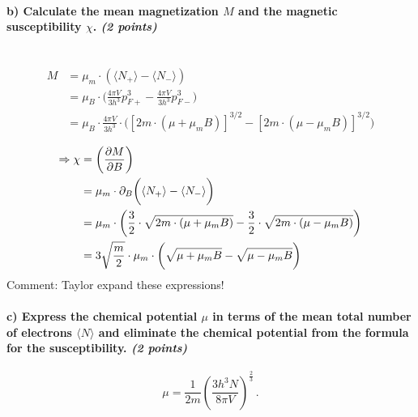 \paragraph{b) Calculate the mean magnetization $M$ and the magnetic 
    susceptibility $\chi$. \textit{(2 points)}
} \ \\
    \begin{align}
        M
        &=\mu_m\cdot(\langle N_+\rangle-\langle N_-\rangle) \\
        &=\mu_B\cdot\bigg(
            \frac{4\pi V}{3h^3}p_{F+}^3-
            \frac{4\pi V}{3h^3}p_{F-}^3
        \bigg) \\
        &=\mu_B\cdot\frac{4\pi V}{3h^3}\cdot\bigg(
            [2m\cdot(\mu+\mu_mB)]^{3/2}-
            [2m\cdot(\mu-\mu_mB)]^{3/2}
        \bigg) \\
    \end{align}
    \begin{align}
        \Rightarrow\chi
        &=\bigg(\frac{\partial M}{\partial B}\bigg) \\
        &=\mu_m\cdot\partial_B\bigg(
            \langle N_+\rangle-\langle N_-\rangle
        \bigg) \\
        &=\mu_m\cdot\bigg(
            \frac{3}{2}\cdot\sqrt{2m\cdot(\mu+\mu_mB)}
            -\frac{3}{2}\cdot\sqrt{2m\cdot(\mu-\mu_mB)}
        \bigg) \\
        &=3\sqrt{\frac{m}{2}}\cdot\mu_m\cdot\bigg(
            \sqrt{\mu+\mu_mB}-\sqrt{\mu-\mu_mB}
        \bigg) 
    \end{align}
    Comment: Taylor expand these expressions!


\paragraph{c) Express the chemical potential $\mu$ in terms of the 
    mean total number of electrons $\langle N\rangle$ and 
    eliminate the chemical potential from the formula 
    for the susceptibility. \textit{(2 points)}
}
    \begin{equation}
        \mu = \frac{1}{2m} \left( \frac{3h^3N}{8\pi V} \right)^{\frac{2}{3}} \,.
    \end{equation}
